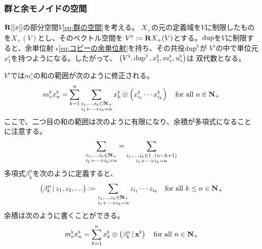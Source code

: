 {\subsubsection{群と余モノイドの空間}\label{s3:群と余モノイドの空間} %
	$\mathbf{R}[[x]]$の部分空間$V$\eqref{eq:群の空間}を考える。
	$X_+$の元の定義域を$V$に制限したものを$X_+(V)$とし、そのベクトル空間を
	$V^\flat:=\mathbf{R} X_+(V)$とする。$\mathinner{\operatorname{dup}}$を$V$に制限すると、余単位射
	$\epsilon$\eqref{eq:コピーの余単位射}を持ち、その共役$\mathinner{\operatorname{dup}}^\flat$が
	$V^\flat$の中で単位元$x_1^\flat$を持つようになる。したがって、
	$\mathinner{\bigl({V^\flat,\mathinner{\operatorname{dup}}^\flat,x_1^\flat,m_\circ^\flat,u_\circ^\flat}\bigr)}$は
	双代数となる。
	
	$V^\flat$では$m_\circ^\flat$の和の範囲が次のように修正される。
	\begin{equation*}\begin{split}
		m_\circ^\flat x_n^\flat = \sum_{k=1}^n 
		\sum_{\substack{i_1,\dots,i_k\in\mathbf{N}_+\\i_1+\cdots+i_k=n}} 
		x_k^\flat\otimes\mathinner{\Bigl({x_{i_1}^\flat\cdots x_{i_k}^\flat}\Bigr)}
		\quad\text{for all } n\in\mathbf{N}_+
	\end{split}\end{equation*}
	ここで、二つ目の和の範囲は次のように有限になり、余積が多項式になること
	に注意する。
	\begin{equation*}\begin{split}
		\sum_{\substack{i_1,\dots,i_k\in\mathbf{N}_+\\i_1+\cdots+i_k=n}} 
		= \sum_{\substack{i_1,\dots,i_k\in1..(n-k+1)\\i_1+\cdots+i_k=n}} 
	\end{split}\end{equation*}
	多項式$\beta^n_k$を次のように定義すると、
	\begin{equation*}\begin{split}
		\mathinner{\bigl({\beta^n_k\,\vert\,z_1, z_2,\dots}\bigr)}
		:= \sum_{\substack{i_1,\dots,i_k\in\mathbf{N}_+\\i_1+\cdots+i_k=n}} 
		z_{i_1}\cdots z_{i_k}
		\quad\text{for all } k\le n\in\mathbf{N}_+
	\end{split}\end{equation*}
	余積は次のように書くことができる。
	\begin{equation*}\begin{split}
		m_\circ^\flat x_n^\flat = \sum_{k=1}^n 
		x_k^\flat\otimes\mathinner{\bigl({\beta_k^n\,\vert\,\mathbf{x}^\flat}\bigr)}
		\quad\text{for all } n\in\mathbf{N}_+
	\end{split}\end{equation*}

}
